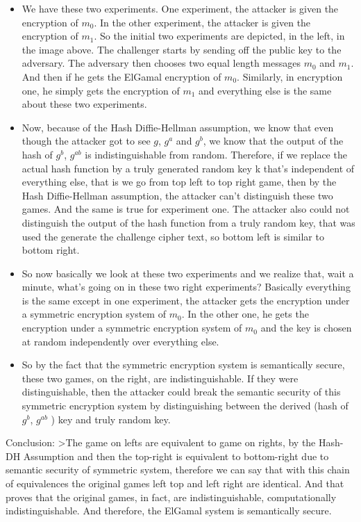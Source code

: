 \documentclass[11pt]{article}
\begin{document}
\begin{itemize}
\item
  We have these two experiments. One experiment, the attacker is given
  the encryption of \(m_0\). In the other experiment, the attacker is
  given the encryption of \(m_1\). So the initial two experiments are
  depicted, in the left, in the image above. The challenger starts by
  sending off the public key to the adversary. The adversary then
  chooses two equal length messages \(m_0\) and \(m_1\). And then if he
  gets the ElGamal encryption of \(m_0\). Similarly, in encryption one,
  he simply gets the encryption of \(m_1\) and everything else is the
  same about these two experiments. 
\item
  Now, because of the Hash Diffie-Hellman assumption, we know that even
  though the attacker got to see \(g\), \(g^a\) and \(g^b\), we know
  that the output of the hash of \(g^b\), \(g^{ab}\) is
  indistinguishable from random. Therefore, if we replace the actual
  hash function by a truly generated random key k that's independent of
  everything else, that is we go from top left to top right game, then
  by the Hash Diffie-Hellman assumption, the attacker can't distinguish
  these two games. And the same is true for experiment one. The attacker
  also could not distinguish the output of the hash function from a
  truly random key, that was used the generate the challenge cipher
  text, so bottom left is similar to bottom right.
\item
  So now basically we look at these two experiments and we realize that,
  wait a minute, what's going on in these two right experiments?
  Basically everything is the same except in one experiment, the
  attacker gets the encryption under a symmetric encryption system of
  \(m_{0}\). In the other one, he gets the encryption under a symmetric
  encryption system of \(m_{0}\) and the key is chosen at random
  independently over everything else.
\item
  So by the fact that the symmetric encryption system is semantically
  secure, these two games, on the right, are indistinguishable. If they
  were distinguishable, then the attacker could break the semantic
  security of this symmetric encryption system by distinguishing between
  the derived (hash of \(g^b\), \(g^{ab}\) ) key and truly random key.
\end{itemize}

Conclusion: \textgreater{}The game on lefts are equivalent to game on
rights, by the Hash-DH Assumption and then the top-right is equivalent
to bottom-right due to semantic security of symmetric system, therefore
we can say that with this chain of equivalences the original games left
top and left right are identical. And that proves that the original
games, in fact, are indistinguishable, computationally
indistinguishable. And therefore, the ElGamal system is semantically
secure.
\end{document}
